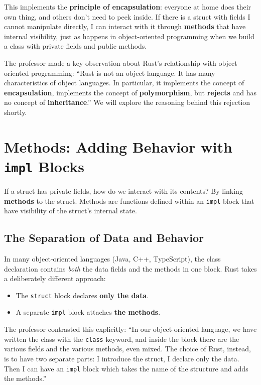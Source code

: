 This implements the \textbf{principle of encapsulation}: everyone at home does their own thing, and others don't need to peek inside. If there is a struct with fields I cannot manipulate directly, I can interact with it through \textbf{methods} that have internal visibility, just as happens in object-oriented programming when we build a class with private fields and public methods.

\begin{exambox}
The professor made a key observation about Rust's relationship with object-oriented programming: ``Rust is not an object language. It has many characteristics of object languages. In particular, it implements the concept of \textbf{encapsulation}, implements the concept of \textbf{polymorphism}, but \textbf{rejects} and has no concept of \textbf{inheritance}.'' We will explore the reasoning behind this rejection shortly.
\end{exambox}

\section{Methods: Adding Behavior with \texttt{impl} Blocks}

If a struct has private fields, how do we interact with its contents? By linking \textbf{methods} to the struct. Methods are functions defined within an \texttt{impl} block that have visibility of the struct's internal state.

\subsection{The Separation of Data and Behavior}

In many object-oriented languages (Java, C++, TypeScript), the class declaration contains \textit{both} the data fields and the methods in one block. Rust takes a deliberately different approach:

\begin{itemize}
    \item The \texttt{struct} block declares \textbf{only the data}.
    \item A separate \texttt{impl} block attaches \textbf{the methods}.
\end{itemize}

The professor contrasted this explicitly: ``In our object-oriented language, we have written the class with the \texttt{class} keyword, and inside the block there are the various fields and the various methods, even mixed. The choice of Rust, instead, is to have two separate parts: I introduce the struct, I declare only the data. Then I can have an \texttt{impl} block which takes the name of the structure and adds the methods.''

